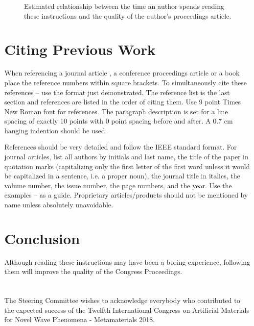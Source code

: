 \documentclass[10pt,a4paper]{article}
\newcommand{\acknowledgement}{\section*{\centering{\textnormal{\normalsize{\textsc{Acknowledgement}}}}}}
\begin{document}
\begin{figure}[h!]
\centering {}
\caption{Estimated relationship between the time an author spends reading these instructions and the quality of the author's proceedings article.} \label{cap}
\end{figure}


\section{Citing Previous Work}

When referencing a journal article \cite{paper}, a conference proceedings article \cite{in proceedings} or a book \cite{Z} place the reference numbers within square brackets. To simultaneously cite these references \cite{paper}--\cite{Z} use the format just demonstrated. The reference list is the last section and references are listed in the order of citing them. Use 9 point Times New Roman font for references. The paragraph description is set for a line spacing of exactly 10 points with 0 point spacing before and after. A 0.7 cm hanging indention should be used.

References should be very detailed and follow the IEEE standard format. For journal articles, list all authors by initials and last name, the title of the paper in quotation marks (capitalizing only the first letter of the first word unless it would be capitalized in a sentence, i.e. a proper noun), the journal title in italics, the volume number, the issue number, the page numbers, and the year. Use the examples \cite{paper}--\cite{Z} as a guide. Proprietary articles/products should not be mentioned by name unless absolutely unavoidable.

\section{Conclusion}
Although reading these instructions may have been a boring experience, following them will improve the quality of the Congress Proceedings.

\acknowledgement
The Steering Committee wishes to acknowledge everybody who contributed to the expected success of the Twelfth International Congress on Artificial Materials for Novel Wave Phenomena - Metamaterials 2018.

\end{document}
